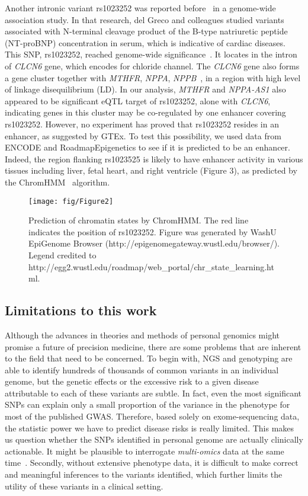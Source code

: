 \documentclass[a4paper, 12pt]{article}
\begin{document}
				Another intronic variant rs1023252 was reported before~\parencite{DelGreco2011} in a genome-wide association study. In that research, del Greco and colleagues studied variants associated with N-terminal cleavage product of the B-type natriuretic peptide (NT-proBNP) concentration in serum, which is indicative of cardiac diseases. This SNP, rs1023252, reached genome-wide significance~\parencite{DelGreco2011}. It locates in the intron of \textit{CLCN6} gene, which encodes for chloride channel. The \textit{CLCN6} gene also forms a gene cluster together with \textit{MTHFR}, \textit{NPPA}, \textit{NPPB}~\parencite{DelGreco2011}, in a region with high level of linkage disequilibrium (LD). In our analysis, \textit{MTHFR} and \textit{NPPA-AS1} also appeared to be significant eQTL target of rs1023252, alone with \textit{CLCN6}, indicating genes in this cluster may be co-regulated by one enhancer covering rs1023252. However, no experiment has proved that rs1023252 resides in an enhancer, as suggested by GTEx. To test this possibility, we used data from ENCODE and RoadmapEpigenetics to see if it is predicted to be an enhancer. Indeed, the region flanking rs1023525 is likely to have enhancer activity in various tissues including liver, fetal heart, and right ventricle (Figure 3), as predicted by the ChromHMM~\parencite{Ernst2012a} algorithm.
				
				\begin{figure*}
					\captionsetup{singlelinecheck=false, labelsep=period}
					\centering
					\texttt{[image: fig/Figure2]}
					\caption[]{Prediction of chromatin states by ChromHMM. The red line indicates the position of rs1023252. Figure was generated by WashU EpiGenome Browser (http://epigenomegateway.wustl.edu/browser/). Legend credited to http://egg2.wustl.edu/roadmap/web\_portal/chr\_state\_learning.html.}
				\end{figure*}
				
			\subsection*{Limitations to this work}
				
				Although the advances in theories and methods of personal genomics might promise a future of precision medicine, there are some problems that are inherent to the field that need to be concerned. To begin with, NGS and genotyping are able to identify hundreds of thousands of common variants in an individual genome, but the genetic effects or the excessive risk to a given disease attributable to each of these variants are subtle. In fact, even the most significant SNPs can explain only a small proportion of the variance in the phenotype for most of the published GWAS. Therefore, based solely on exome-sequencing data, the statistic power we have to predict disease risks is really limited. This makes us question whether the SNPs identified in personal genome are actually clinically actionable. It might be plausible to interrogate \textit{multi-omics} data at the same time~\parencite{Chen2012a}. Secondly, without extensive phenotype data, it is difficult to make correct and meaningful inferences to the variants identified, which further limits the utility of these variants in a clinical setting. 
				
\end{document}
